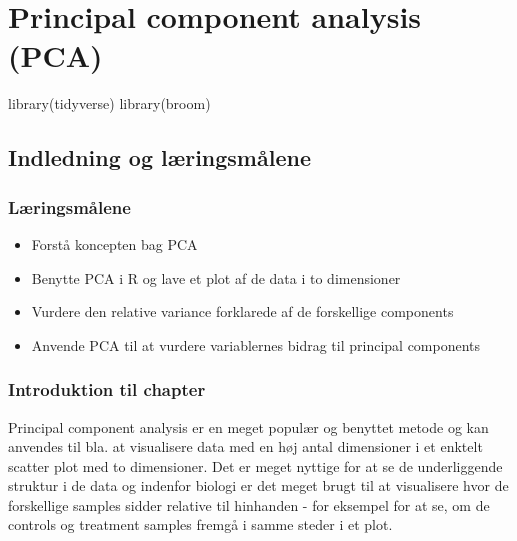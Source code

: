 \documentclass[
]{book}
\newenvironment{Shaded}{\begin{snugshade}}{\end{snugshade}}
\newcommand{\FunctionTok}[1]{\textcolor[rgb]{0.00,0.00,0.00}{#1}}
\newcommand{\NormalTok}[1]{#1}
\providecommand{\tightlist}{%
  \setlength{\itemsep}{0pt}\setlength{\parskip}{0pt}}
\begin{document}
\hypertarget{principal-component-analysis-pca}{%
\chapter{Principal component analysis (PCA)}\label{principal-component-analysis-pca}}

\begin{Shaded}
\begin{Highlighting}[]
\FunctionTok{library}\NormalTok{(tidyverse)}
\FunctionTok{library}\NormalTok{(broom)}
\end{Highlighting}
\end{Shaded}

\hypertarget{indledning-og-luxe6ringsmuxe5lene-3}{%
\section{Indledning og læringsmålene}\label{indledning-og-luxe6ringsmuxe5lene-3}}

\hypertarget{luxe6ringsmuxe5lene-5}{%
\subsection{Læringsmålene}\label{luxe6ringsmuxe5lene-5}}

\begin{itemize}
\tightlist
\item
  Forstå koncepten bag PCA
\item
  Benytte PCA i R og lave et plot af de data i to dimensioner
\item
  Vurdere den relative variance forklarede af de forskellige components
\item
  Anvende PCA til at vurdere variablernes bidrag til principal components
\end{itemize}

\hypertarget{introduktion-til-chapter-2}{%
\subsection{Introduktion til chapter}\label{introduktion-til-chapter-2}}

Principal component analysis er en meget populær og benyttet metode og kan anvendes til bla. at visualisere data med en høj antal dimensioner i et enktelt scatter plot med to dimensioner. Det er meget nyttige for at se de underliggende struktur i de data og indenfor biologi er det meget brugt til at visualisere hvor de forskellige samples sidder relative til hinhanden - for eksempel for at se, om de controls og treatment samples fremgå i samme steder i et plot.
\end{document}
